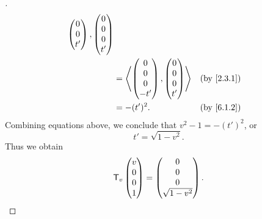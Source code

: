 \begin{proof}[]
\begin{align*}
{\begin{pmatrix}
                                                          0 \\
                                                          0 \\
                                                          t'
                                                        \end{pmatrix}, \begin{pmatrix}
                                                                         0 \\
                                                                         0 \\
                                                                         0 \\
                                                                         t'
                                                                       \end{pmatrix}}                                      \\
                                         & = \inn{\begin{pmatrix}
                                                      0 \\
                                                      0 \\
                                                      0 \\
                                                      -t'
                                                    \end{pmatrix}, \begin{pmatrix}
                                                                     0 \\
                                                                     0 \\
                                                                     0 \\
                                                                     t'
                                                                   \end{pmatrix}}     &  & \by{2.3.1}                      \\
                                         & = -(t')^2.                         &  & \by{6.1.2}
  \end{align*}
  Combining equations above, we conclude that \(v^2 - 1 = -(t')^2\), or
  \[
    t' = \sqrt{1 - v^2}.
  \]
  Thus we obtain
  \[
    \mathsf{T}_v\begin{pmatrix}
      v \\
      0 \\
      0 \\
      1
    \end{pmatrix} = \begin{pmatrix}
      0 \\
      0 \\
      0 \\
      \sqrt{1 - v^2}
    \end{pmatrix}.
  \]


\end{proof}
